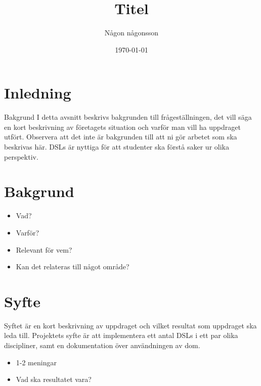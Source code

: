\documentclass[12pt,a4paper]{article}
\begin{document}
 

\title{Titel}
\date{\today}
\author{Någon någonsson}

\maketitle

\newpage
\tableofcontents

\setcounter{page}{1}
\setlength{\parskip}{0pt plus 1pt}
\newpage

\section{Inledning}

Bakgrund I detta avsnitt beskrivs bakgrunden till frågeställningen,
det vill säga en kort beskrivning av företagets situation och varför man vill
ha uppdraget utfört. Observera att det inte är bakgrunden till att ni gör arbetet
som ska beskrivas här.
DSLs är nyttiga för att studenter ska förstå saker ur olika perspektiv.

\section{Bakgrund}

\begin{itemize}
    \item Vad?
    \item Varför?
    \item Relevant för vem?
    \item Kan det relateras till något område?
\end{itemize}

\section{Syfte}

Syftet är en kort beskrivning av uppdraget och vilket resultat som uppdraget
ska leda till.
Projektets syfte är att implementera ett antal DSLs i ett par olika discipliner, samt
en dokumentation över användningen av dom.

\begin{itemize}
    \item 1-2 meningar
    \item Vad ska resultatet vara?
\end{itemize}
\end{document}
